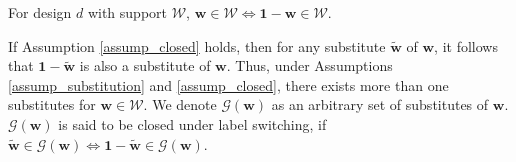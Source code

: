 \documentclass[12pt]{article}
\begin{document}
\begin{assumption} \normalfont
For design $d$ with support $\mathcal{W}$, $\bm{w} \in \mathcal{W} \iff \bm{1} - \bm{w} \in \mathcal{W}$. \label{assump_closed}   
\end{assumption}
If Assumption \ref{assump_closed} holds, then for any substitute $\tilde{\bm{w}}$ of $\bm{w}$, it follows that $\bm{1}-\tilde{\bm{w}}$ is also a substitute of $\bm{w}$. 
Thus, under Assumptions \ref{assump_substitution} and \ref{assump_closed}, there exists more than one substitutes for $\bm{w} \in \mathcal{W}$. We denote $\mathcal{G}(\bm{w})$ as an arbitrary set of substitutes of $\bm{w}$. $\mathcal{G}(\bm{w})$ is said to be closed under label switching, if $\tilde{\bm{w}} \in \mathcal{G}(\bm{w}) \iff \bm{1} - \tilde{\bm{w}} \in \mathcal{G}(\bm{w})$. 
\end{document}
